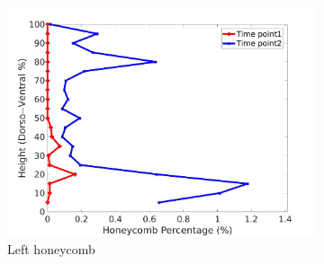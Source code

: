 \begin{figure}[H]
\begin{subfigure}{.42\linewidth}
  \includegraphics[width=\linewidth,trim={{.0\wd0} {.0\wd0} {.0\wd0} {.0\wd0}},clip]{Appendix/Image_AppexA/DorsoToVentral/IPF13LeftLungHoneycombDiseaseDorsoToVentral.jpg} %
  \caption{Left honeycomb}
  \label{fig:IPF13DiseaseDorsoToVentral-e} 
\end{subfigure} 
\begin{subfigure}{.42\linewidth}%

\end{subfigure}
\end{figure}
